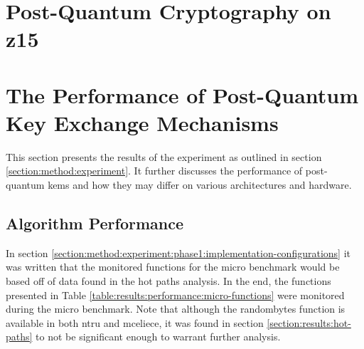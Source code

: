 

\section{Post-Quantum Cryptography on z15}


\section{The Performance of Post-Quantum Key Exchange Mechanisms}

This section presents the results of the experiment as outlined in section \ref{section:method:experiment}. It further discusses the performance of \gls{post-quantum} \glspl{kem} and how they may differ on various architectures and hardware.

\subsection{Algorithm Performance}

In section \ref{section:method:experiment:phase1:implementation-configurations} it was written that the monitored functions for the micro benchmark would be based off of data found in the hot paths analysis. In the end, the functions presented in Table \ref{table:results:performance:micro-functions} were monitored during the micro benchmark. Note that although the randombytes function is available in both \gls{ntru} and \gls{mceliece}, it was found in section \ref{section:results:hot-paths} to not be significant enough to warrant further analysis.

